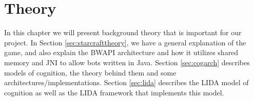 
\chapter{Theory}
In this chapter we will present background theory that is important for our project. In Section \ref{sec:starcrafttheory}, we have a general explanation of the game, and also explain the BWAPI architecture and how it utilizes shared memory and JNI to allow bots written in Java. Section \ref{sec:cogarch} describes models of cognition, the theory behind them and some architectures/implementations. Section \ref{sec:lida} describes the LIDA model of cognition as well as the LIDA framework that implements this model.




